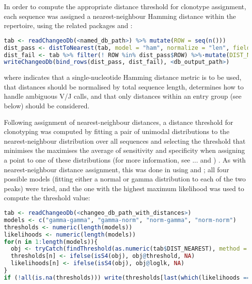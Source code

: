 In order to compute the appropriate distance threshold for clonotype assignment, each sequence was assigned a nearest-neighbour Hamming distance within the repertoire, using the related  packages  and :

\begin{lstlisting}[language=R]
tab <- readChangeoDb(<named_db_path>) %>% mutate(ROW = seq(n()))
dist_pass <- distToNearest(tab, model = "ham", normalize = "len", fields = <group_field>, first = FALSE)
dist_fail <- tab %>% filter(! ROW %in% dist_pass$ROW) %>%·mutate(DIST_NEAREST = NA) 
writeChangeoDb(bind_rows(dist_pass, dist_fail), <db_output_path>)
\end{lstlisting}

where  indicates that a single-nucleotide Hamming distance metric is to be used,  that distances should be normalised by total sequence length,  determines how to handle ambiguous V/J calls, and  that only distances within an entry group (see below) should be considered.

Following assignment of nearest-neighbour distances, a distance threshold for clonotyping was computed by fitting a pair of unimodal distributions to the nearest-neighbour distribution over all sequences and selecting the threshold that minimises the maximises the average of sensitivity and specificity when assigning a point to one of these distributions (for more information, see ... and \parencite{nouri2018threshold}) .%
As with nearest-neighbour distance assignment, this was done in  using  and ; all four possible models (fitting either a normal or gamma distribution to each of the two peaks) were tried, and the one with the highest maximum likelihood was used to compute the threshold value:

\begin{lstlisting}[language=R]
tab <- readChangeoDb(<changeo_db_path_with_distances>)
models <- c("gamma-gamma", "gamma-norm", "norm-gamma", "norm-norm")
thresholds <- numeric(length(models))
likelihoods <- numeric(length(models))
for(n in 1:length(models)){
  obj <- tryCatch(findThreshold(as.numeric(tab$DIST_NEAREST), method = "gmm", model = "hmm", cutoff = "opt"), error = function(e) return(e$message), warning = function(w) return(w$message))
  thresholds[n] <- ifelse(isS4(obj), obj@threshold, NA)
  likelihoods[n] <- ifelse(isS4(obj), obj@loglk, NA)
}
if (!all(is.na(thresholds))) write(thresholds[last(which(likelihoods == max(likelihoods, na.rm = TRUE))], <threshold_output_path>)
\end{lstlisting} 

